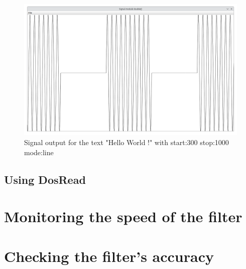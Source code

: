 \begin{figure}[!h]
	\begin{center}
		\includegraphics[width=15cm]{images/StdDraw1.png}
	\end{center}
	\caption{Signal output for the text "Hello World !" with start:300 stop:1000 mode:line}
\end{figure}

\subsection{Using DosRead}



\section{Monitoring the speed of the filter}

\section{Checking the filter's accuracy}